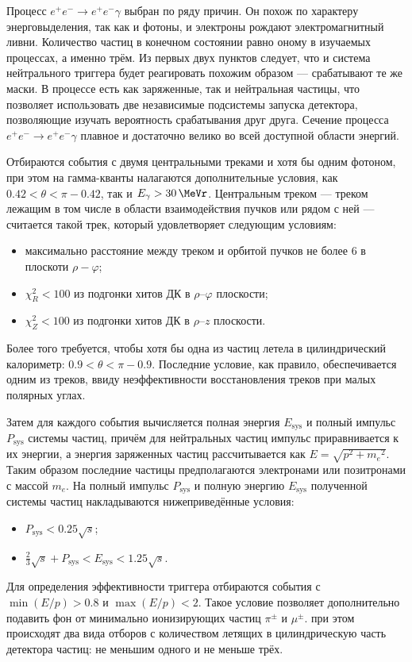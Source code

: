 Процесс $e^+e^- \to e^+e^-\gamma$ выбран по ряду причин.
Он похож по характеру энерговыделения,
так как и фотоны,
и электроны рождают электромагнитный ливни.
Количество частиц в конечном состоянии равно оному в изучаемых процессах,
а именно трём.
Из первых двух пунктов следует,
что и система нейтрального триггера будет реагировать похожим образом
---
срабатывают те же маски.
В процессе есть как заряженные,
так и нейтральная частицы,
что позволяет использовать две независимые подсистемы запуска детектора,
позволяющие изучать вероятность срабатывания друг друга.
Сечение процесса $e^+e^- \to e^+ e^- \gamma$ плавное и достаточно велико во всей доступной области энергий.


Отбираются события с двумя центральными треками и хотя бы одним фотоном,
при этом на гамма-кванты налагаются дополнительные условия, 
как $0.42 < \theta < \pi - 0.42$, 
так и $E_\gamma > \SI{30}{\MeVr}$.
Центральным треком
---
треком лежащим в том числе в области взаимодействия пучков или рядом с ней
---
считается такой трек,
который удовлетворяет следующим условиям:
\begin{itemize}
	\item максимально расстояние между треком и орбитой пучков не более \SI{6}{\cmr} в плоскоти $\rho-\varphi$;
	\item $\chi^2_{R} < 100$ из подгонки хитов ДК в $\rho$--$\varphi$ плоскости;
	\item $\chi^2_{Z} < 100$ из подгонки хитов ДК в $\rho$--$z$ плоскости.
\end{itemize}
Более того требуется, чтобы хотя бы одна из частиц летела в цилиндрический калориметр:
$ 0.9 < \theta < \pi - 0.9 $.
Последние условие,
как правило,
обеспечивается одним из треков,
ввиду неэффективности восстановления треков при малых полярных углах.

Затем для каждого события вычисляется полная энергия $E_\text{sys}$ и полный импульс $P_\text{sys}$ системы частиц,
причём для нейтральных частиц импульс приравнивается к их энергии, а энергия заряженных частиц рассчитывается как $E = \sqrt{p^2 + {m_e}^2}$.
Таким образом последние частицы предполагаются электронами или позитронами с массой $m_e$.
На полный импульс $P_\text{sys}$ и полную энергию $E_\text{sys}$ полученной системы частиц накладываются нижеприведённые условия:
\begin{itemize}
    \item $P_\text{sys} < 0.25 \sqrt{s}$;
    \item $\frac{2}{3} \sqrt{s} + P_\text{sys} < E_\text{sys} < 1.25 \sqrt{s}$.
\end{itemize}
Для определения эффективности триггера отбираются события с $\min (E/p) > 0.8$ и $\max (E/p) < 2$.
Такое условие позволяет дополнительно подавить
фон от минимально ионизирующих частиц $\pi^\pm$ и $\mu^\pm$.
при этом происходят два вида отборов с количеством летящих в цилиндрическую часть детектора частиц:
не меньшим одного и не меньше трёх.


